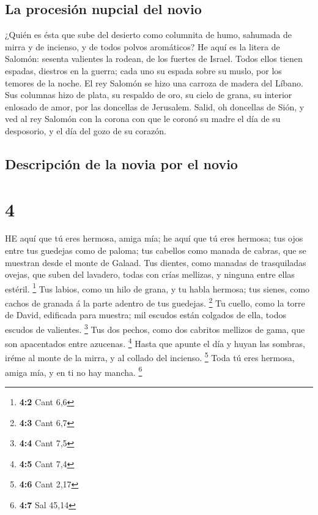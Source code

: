 \hypertarget{la-procesiuxf3n-nupcial-del-novio}{%
\subsection{La procesión nupcial del
novio}\label{la-procesiuxf3n-nupcial-del-novio}}

 ¿Quién es ésta que sube del desierto como columnita de
humo, sahumada de mirra y de incienso, y de todos polvos aromáticos?
 He aquí es la litera de Salomón: sesenta valientes la
rodean, de los fuertes de Israel.  Todos ellos tienen
espadas, diestros en la guerra; cada uno su espada sobre su muslo, por
los temores de la noche.  El rey Salomón se hizo una carroza
de madera del Líbano.  Sus columnas hizo de plata, su
respaldo de oro, su cielo de grana, su interior enlosado de amor, por
las doncellas de Jerusalem.  Salid, oh doncellas de Sión, y
ved al rey Salomón con la corona con que le coronó su madre el día de su
desposorio, y el día del gozo de su corazón.

\hypertarget{descripciuxf3n-de-la-novia-por-el-novio}{%
\subsection{Descripción de la novia por el
novio}\label{descripciuxf3n-de-la-novia-por-el-novio}}

\hypertarget{section-3}{%
\section{4}\label{section-3}}

 HE aquí que tú eres hermosa, amiga mía; he aquí que tú eres
hermosa; tus ojos entre tus guedejas como de paloma; tus cabellos como
manada de cabras, que se muestran desde el monte de Galaad. 
Tus dientes, como manadas de trasquiladas ovejas, que suben del
lavadero, todas con crías mellizas, y ninguna entre ellas estéril.
\footnote{\textbf{4:2} Cant 6,6}  Tus labios, como un hilo
de grana, y tu habla hermosa; tus sienes, como cachos de granada á la
parte adentro de tus guedejas. \footnote{\textbf{4:3} Cant 6,7}
 Tu cuello, como la torre de David, edificada para muestra;
mil escudos están colgados de ella, todos escudos de valientes.
\footnote{\textbf{4:4} Cant 7,5}  Tus dos pechos, como dos
cabritos mellizos de gama, que son apacentados entre azucenas.
\footnote{\textbf{4:5} Cant 7,4}  Hasta que apunte el día y
huyan las sombras, iréme al monte de la mirra, y al collado del
incienso. \footnote{\textbf{4:6} Cant 2,17}  Toda tú eres
hermosa, amiga mía, y en ti no hay mancha. \footnote{\textbf{4:7} Sal
  45,14}

